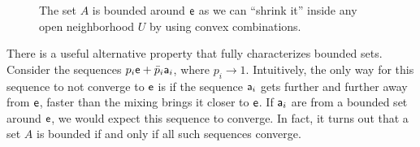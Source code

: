\begin{mathSection}
\begin{figure}[H]
	\caption{The set $A$ is bounded around $\ens$ as we can ``shrink it'' inside any open neighborhood $U$ by using convex combinations.}\label{pm-es-figBoundedDefinition}
\end{figure}	

\end{mathSection}

There is a useful alternative property that fully characterizes bounded sets. Consider the sequences $p_i \ens + \bar{p}_i \ens[a]_i$, where $p_i \to 1$. Intuitively, the only way for this sequence to not converge to $\ens$ is if the sequence $\ens[a]_i$ gets further and further away from $\ens$, faster than the mixing brings it closer to $\ens$. If $\ens[a]_i$ are from a bounded set around $\ens$, we would expect this sequence to converge. In fact, it turns out that a set $A$ is bounded if and only if all such sequences converge.
	
